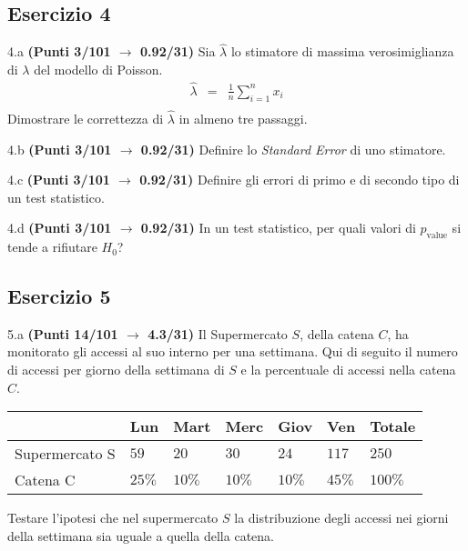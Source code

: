 \documentclass[
  11pt,
]{book}
\theoremstyle{mytheoremstyle}
\theoremstyle{mydefstyle}
\begin{document}
\subsection{Esercizio 4}\label{esercizio-4-10}

4.a \textbf{(Punti 3/101 \(\rightarrow\) 0.92/31)} Sia \(\hat \lambda\) lo stimatore di massima verosimiglianza di \(\lambda\) del modello di Poisson.
\begin{eqnarray*}
  \hat\lambda &=&  \frac 1n\sum_{i=1}^nx_i\\
\end{eqnarray*}
Dimostrare le correttezza di \(\hat\lambda\) in almeno tre passaggi.

4.b \textbf{(Punti 3/101 \(\rightarrow\) 0.92/31)} Definire lo \emph{Standard Error} di uno stimatore.

4.c \textbf{(Punti 3/101 \(\rightarrow\) 0.92/31)} Definire gli errori di primo e di secondo tipo di un test statistico.

4.d \textbf{(Punti 3/101 \(\rightarrow\) 0.92/31)} In un test statistico, per quali valori di \(p_\text{value}\) si tende a rifiutare \(H_0\)?

\subsection{Esercizio 5}\label{esercizio-5-8}

5.a \textbf{(Punti 14/101 \(\rightarrow\) 4.3/31)} Il Supermercato \(S\), della catena \(C\), ha monitorato gli accessi al suo interno per una settimana.
Qui di seguito il numero di accessi per giorno della settimana di \(S\) e la percentuale di accessi nella catena \(C\).

\begin{table}[H]
\centering
\begin{tabular}{lllllll}
\toprule
  & Lun & Mart & Merc & Giov & Ven & Totale\\
\midrule
Supermercato S & $59$ & $20$ & $30$ & $24$ & $117$ & $250$\\
Catena C & $25\%$ & $10\%$ & $10\%$ & $10\%$ & $45\%$ & $100\%$\\
\bottomrule
\end{tabular}
\end{table}

Testare l'ipotesi che nel supermercato \(S\) la distribuzione degli accessi nei giorni della settimana sia uguale a quella della catena.
\end{document}
